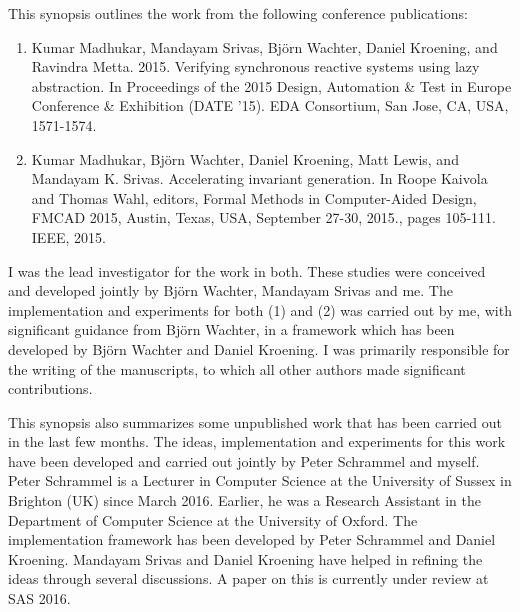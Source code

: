 \begin{originality}
  This synopsis outlines the work from the following conference publications:
  \begin{enumerate}
  \item Kumar Madhukar, Mandayam Srivas, Bj\"{o}rn Wachter, Daniel Kroening, and Ravindra Metta. 2015. Verifying synchronous reactive systems using lazy abstraction. In Proceedings of the 2015 Design, Automation \& Test in Europe Conference \& Exhibition (DATE '15). EDA Consortium, San Jose, CA, USA, 1571-1574.

  \item Kumar Madhukar, Bj\"{o}rn Wachter, Daniel Kroening, Matt Lewis, and Mandayam K. Srivas. Accelerating invariant generation. In Roope Kaivola and Thomas Wahl, editors, Formal Methods in Computer-Aided Design, FMCAD 2015, Austin, Texas, USA, September 27-30, 2015., pages 105-111. IEEE, 2015.
  \end{enumerate}

  I was the lead investigator for the work in both. These studies were conceived and developed jointly by Bj\"{o}rn Wachter, Mandayam Srivas and me. The implementation and experiments for both (1) and (2) was carried out by me, with significant guidance from Bj\"{o}rn Wachter, in a framework which has been developed by Bj\"{o}rn Wachter and Daniel Kroening. I was primarily responsible for the writing of the manuscripts, to which all other authors made significant contributions.

  This synopsis also summarizes some unpublished work that has been carried out in the last few months. The ideas, implementation and experiments for this work have been developed and carried out jointly by Peter Schrammel and myself. Peter Schrammel is a Lecturer in Computer Science at the University of Sussex in Brighton (UK) since March 2016. Earlier, he was a Research Assistant in the Department of Computer Science at the University of Oxford. The implementation framework has been developed by Peter Schrammel and Daniel Kroening. Mandayam Srivas and Daniel Kroening have helped in refining the ideas through several discussions. A paper on this is currently under review at SAS 2016.
  
\end{originality}
